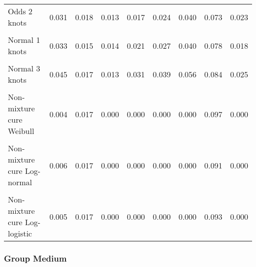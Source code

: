 \documentclass[
]{article}
\begin{document}
\begin{table}[H]
{\begin{tabular}[t]{lrrrrrrrr}
Odds 2 knots & 0.031 & 0.018 & 0.013 & 0.017 & 0.024 & 0.040 & 0.073 & 0.023\\
\cellcolor{gray!10}{Odds 3 knots} & \cellcolor{gray!10}{0.037} & \cellcolor{gray!10}{0.021} & \cellcolor{gray!10}{0.016} & \cellcolor{gray!10}{0.020} & \cellcolor{gray!10}{0.029} & \cellcolor{gray!10}{0.050} & \cellcolor{gray!10}{0.084} & \cellcolor{gray!10}{0.029}\\
Normal 1 knots & 0.033 & 0.015 & 0.014 & 0.021 & 0.027 & 0.040 & 0.078 & 0.018\\
\cellcolor{gray!10}{Normal 2 knots} & \cellcolor{gray!10}{0.034} & \cellcolor{gray!10}{0.016} & \cellcolor{gray!10}{0.014} & \cellcolor{gray!10}{0.022} & \cellcolor{gray!10}{0.028} & \cellcolor{gray!10}{0.041} & \cellcolor{gray!10}{0.078} & \cellcolor{gray!10}{0.019}\\
Normal 3 knots & 0.045 & 0.017 & 0.013 & 0.031 & 0.039 & 0.056 & 0.084 & 0.025\\
\cellcolor{gray!10}{Mixture cure Weibull} & \cellcolor{gray!10}{0.004} & \cellcolor{gray!10}{0.017} & \cellcolor{gray!10}{0.000} & \cellcolor{gray!10}{0.000} & \cellcolor{gray!10}{0.000} & \cellcolor{gray!10}{0.000} & \cellcolor{gray!10}{0.097} & \cellcolor{gray!10}{0.000}\\
Non-mixture cure Weibull & 0.004 & 0.017 & 0.000 & 0.000 & 0.000 & 0.000 & 0.097 & 0.000\\
\cellcolor{gray!10}{Mixture cure Log-normal} & \cellcolor{gray!10}{0.005} & \cellcolor{gray!10}{0.017} & \cellcolor{gray!10}{0.000} & \cellcolor{gray!10}{0.000} & \cellcolor{gray!10}{0.000} & \cellcolor{gray!10}{0.000} & \cellcolor{gray!10}{0.091} & \cellcolor{gray!10}{0.000}\\
Non-mixture cure Log-normal & 0.006 & 0.017 & 0.000 & 0.000 & 0.000 & 0.000 & 0.091 & 0.000\\
\cellcolor{gray!10}{Mixture cure Log-logistic} & \cellcolor{gray!10}{0.005} & \cellcolor{gray!10}{0.017} & \cellcolor{gray!10}{0.000} & \cellcolor{gray!10}{0.000} & \cellcolor{gray!10}{0.000} & \cellcolor{gray!10}{0.000} & \cellcolor{gray!10}{0.093} & \cellcolor{gray!10}{0.000}\\
Non-mixture cure Log-logistic & 0.005 & 0.017 & 0.000 & 0.000 & 0.000 & 0.000 & 0.093 & 0.000\\
\bottomrule
\end{tabular}}
\end{table}

\clearpage

\subsubsection{Group Medium}\label{group-medium}
\end{document}
